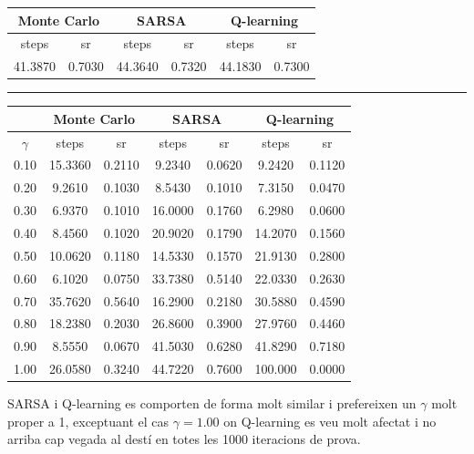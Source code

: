 \documentclass[12pt,a4paper]{report}
\begin{document}
\begin{table}[H]
  \centering
  \begin{tabular}{| c c | c c | c c |}
    \hline
    \multicolumn{2}{|c|}{Monte Carlo} & \multicolumn{2}{|c|}{SARSA} & \multicolumn{2}{|c|}{Q-learning} \\
    \hline
    steps & sr & steps & sr & steps & sr  \\
    \hline
    41.3870 & 0.7030 & 44.3640 & 0.7320 & 44.1830 & 0.7300 \\
    \hline
  \end{tabular}
\end{table}

\vspace*{10pt}\hrule

\begin{table}[H]
  \centering
  \begin{tabular}{| c | c c | c c | c c |}
    \hline
      & \multicolumn{2}{|c|}{Monte Carlo} & \multicolumn{2}{|c|}{SARSA} & \multicolumn{2}{|c|}{Q-learning} \\
    \hline
    $\gamma$ & steps & sr & steps & sr & steps & sr \\
    \hline
    0.10 & 15.3360 & 0.2110 & 9.2340  & 0.0620 & 9.2420  & 0.1120 \\
    0.20 & 9.2610  & 0.1030 & 8.5430  & 0.1010 & 7.3150  & 0.0470 \\
    0.30 & 6.9370  & 0.1010 & 16.0000 & 0.1760 & 6.2980  & 0.0600 \\
    0.40 & 8.4560  & 0.1020 & 20.9020 & 0.1790 & 14.2070 & 0.1560 \\
    0.50 & 10.0620 & 0.1180 & 14.5330 & 0.1570 & 21.9130 & 0.2800 \\
    0.60 & 6.1020  & 0.0750 & 33.7380 & 0.5140 & 22.0330 & 0.2630 \\
    0.70 & 35.7620 & 0.5640 & 16.2900 & 0.2180 & 30.5880 & 0.4590 \\
    0.80 & 18.2380 & 0.2030 & 26.8600 & 0.3900 & 27.9760 & 0.4460 \\
    0.90 & 8.5550  & 0.0670 & 41.5030 & 0.6280 & 41.8290 & 0.7180 \\
    1.00 & 26.0580 & 0.3240 & 44.7220 & 0.7600 & 100.000 & 0.0000 \\
    \hline
  \end{tabular}
\end{table}

SARSA i Q-learning es comporten de forma molt similar i prefereixen un $\gamma$ molt proper a 1,
exceptuant el cas $\gamma = 1.00$ on Q-learning es veu molt afectat i no arriba cap vegada al destí en totes les
1000 iteracions de prova.
\end{document}
